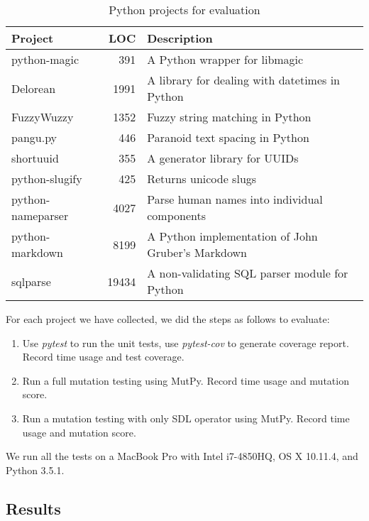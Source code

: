 \documentclass[12pt]{article}
\begin{document}
\begin{table}[H]
\begin{center}
\caption{Python projects for evaluation}
\begin{tabular}{|l|r|l|}
\hline
{\bf Project} & {\bf LOC} & {\bf Description} \\
\hline
python-magic      & 391   & A Python wrapper for libmagic \\
Delorean          & 1991  & A library for dealing with datetimes in Python \\
FuzzyWuzzy        & 1352  & Fuzzy string matching in Python \\
pangu.py          & 446   & Paranoid text spacing in Python \\
shortuuid         & 355   & A generator library for UUIDs \\
python-slugify    & 425   & Returns unicode slugs \\
python-nameparser & 4027  & Parse human names into individual components \\
python-markdown   & 8199  & A Python implementation of John Gruber’s Markdown \\
sqlparse          & 19434 & A non-validating SQL parser module for Python \\
\hline
\end{tabular}
\end{center}
\end{table}

For each project we have collected, we did the steps as follows to evaluate:

\begin{enumerate}
  \item Use \emph{pytest} \cite{pytest} to run the unit tests, use \emph{pytest-cov} \cite{pytest-cov} to generate coverage report. Record time usage and test coverage.
  \item Run a full mutation testing using MutPy. Record time usage and mutation score.
  \item Run a mutation testing with only SDL operator using MutPy. Record time usage and mutation score.
\end{enumerate}

We run all the tests on a MacBook Pro with Intel i7-4850HQ, OS X 10.11.4, and Python 3.5.1.

\subsection{Results}
\end{document}
